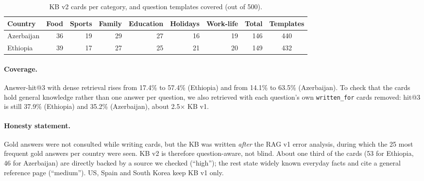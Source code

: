 \documentclass[11pt]{article}
\begin{document}
\begin{table}[h]
\centering
\caption{KB v2 cards per category, and question templates covered (out of 500).}
\label{tab:kbv2}
\begin{tabular}{lrrrrrrrc}
\toprule
Country & Food & Sports & Family & Education & Holidays & Work-life & Total & Templates \\
\midrule
Azerbaijan & 36 & 19 & 29 & 27 & 16 & 19 & 146 & 440 \\
Ethiopia   & 39 & 17 & 27 & 25 & 21 & 20 & 149 & 432 \\
\bottomrule
\end{tabular}
\end{table}

\paragraph{Coverage.} Answer-hit@3 with dense retrieval rises from 17.4\% to 57.4\% (Ethiopia) and from
14.1\% to 63.5\% (Azerbaijan). To check that the cards hold general knowledge rather than one answer per
question, we also retrieved with each question's own \texttt{written\_for} cards removed: hit@3 is
still 37.9\% (Ethiopia) and 35.2\% (Azerbaijan), about 2.5$\times$ KB v1.

\paragraph{Honesty statement.} Gold answers were not consulted while writing cards, but the KB was
written \emph{after} the RAG v1 error analysis, during which the 25 most frequent gold answers per
country were seen. KB v2 is therefore question-aware, not blind. About one third of the cards
(53 for Ethiopia, 46 for Azerbaijan) are directly backed by a source we checked (``high''); the rest
state widely known everyday facts and cite a general reference page (``medium''). US, Spain and South
Korea keep KB v1 only.
\end{document}
